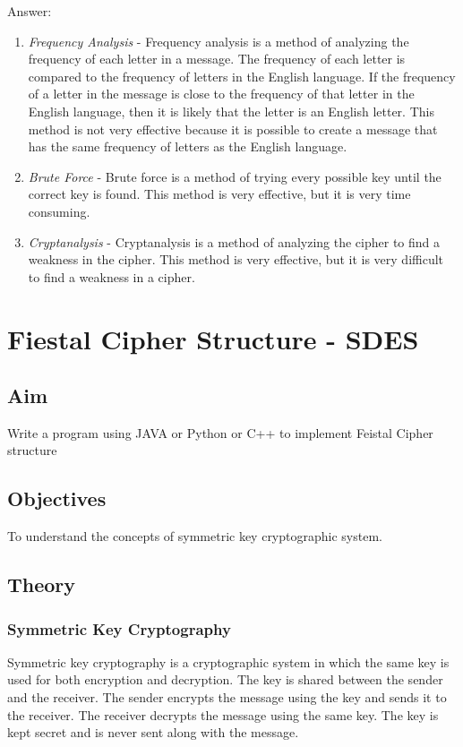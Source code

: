\documentclass[openany]{book}
\begin{document}
\begin{enumerate}
	      Answer:
	      \begin{enumerate}
		      \item \textit{Frequency Analysis} - Frequency analysis is a method of analyzing the frequency of each letter in a message. The frequency of each letter is compared to the frequency of letters in the English language. If the frequency of a letter in the message is close to the frequency of that letter in the English language, then it is likely that the letter is an English letter. This method is not very effective because it is possible to create a message that has the same frequency of letters as the English language.
		      \item \textit{Brute Force} - Brute force is a method of trying every possible key until the correct key is found. This method is very effective, but it is very time consuming.
		      \item \textit{Cryptanalysis} - Cryptanalysis is a method of analyzing the cipher to find a weakness in the cipher. This method is very effective, but it is very difficult to find a weakness in a cipher.

	      \end{enumerate}
\end{enumerate}



\chapter{Fiestal Cipher Structure - SDES}
\section{Aim}
Write a program using JAVA or Python or C++ to implement Feistal Cipher structure

\section{Objectives}
To understand the concepts of symmetric key cryptographic system.

\section{Theory}
\subsection{Symmetric Key Cryptography}

Symmetric key cryptography is a cryptographic system in which the same key is used for both encryption and decryption. The key is shared between the sender and the receiver. The sender encrypts the message using the key and sends it to the receiver. The receiver decrypts the message using the same key. The key is kept secret and is never sent along with the message.
\end{document}
